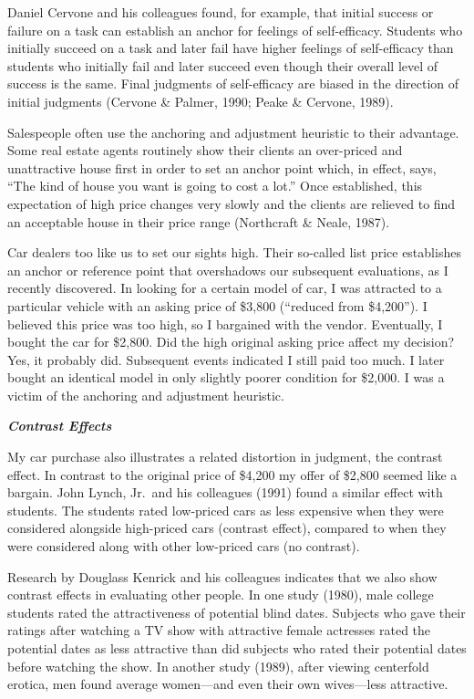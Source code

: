 \documentclass[
]{book}
\begin{document}
Daniel Cervone and his colleagues found, for example, that initial success or failure on a task can establish an anchor for feelings of self-efficacy. Students who initially succeed on a task and later fail have higher feelings of self-efficacy than students who initially fail and later succeed even though their overall level of success is the same. Final judgments of self-efficacy are biased in the direction of initial judgments (Cervone \& Palmer, 1990; Peake \& Cervone, 1989).

Salespeople often use the anchoring and adjustment heuristic to their advantage. Some real estate agents routinely show their clients an over-priced and unattractive house first in order to set an anchor point which, in effect, says, ``The kind of house you want is going to cost a lot.'' Once established, this expectation of high price changes very slowly and the clients are relieved to find an acceptable house in their price range (Northcraft \& Neale, 1987).

Car dealers too like us to set our sights high. Their so-called list price establishes an anchor or reference point that overshadows our subsequent evaluations, as I recently discovered. In looking for a certain model of car, I was attracted to a particular vehicle with an asking price of \$3,800 (``reduced from \$4,200''). I believed this price was too high, so I bargained with the vendor. Eventually, I bought the car for \$2,800. Did the high original asking price affect my decision? Yes, it probably did. Subsequent events indicated I still paid too much. I later bought an identical model in only slightly poorer condition for \$2,000. I was a victim of the anchoring and adjustment heuristic.

\textbf{\emph{Contrast Effects}}

My car purchase also illustrates a related distortion in judgment, the contrast effect. In contrast to the original price of \$4,200 my offer of \$2,800 seemed like a bargain. John Lynch, Jr.~and his colleagues (1991) found a similar effect with students. The students rated low-priced cars as less expensive when they were considered alongside high-priced cars (contrast effect), compared to when they were considered along with other low-priced cars (no contrast).

Research by Douglass Kenrick and his colleagues indicates that we also show contrast effects in evaluating other people. In one study (1980), male college students rated the attractiveness of potential blind dates. Subjects who gave their ratings after watching a TV show with attractive female actresses rated the potential dates as less attractive than did subjects who rated their potential dates before watching the show. In another study (1989), after viewing centerfold erotica, men found average women---and even their own wives---less attractive.
\end{document}
